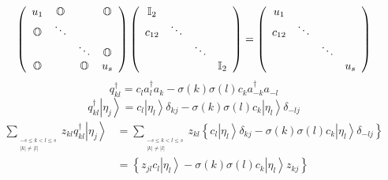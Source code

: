 \documentclass[aps,preprint]{revtex4}%
\begin{document}
\begin{equation}
\left(
\begin{array}
[c]{cccc}%
u_{1} & \mathbb{O} &  & \mathbb{O}\\
\mathbb{O} & \ddots &  & \\
&  & \ddots & \mathbb{O}\\
\mathbb{O} &  & \mathbb{O} & u_{s}%
\end{array}
\right)  \left(
\begin{array}
[c]{cccc}%
\mathbb{I}_{2} &  &  & \\
c_{12} & \ddots &  & \\
&  & \ddots & \\
&  &  & \mathbb{I}_{2}%
\end{array}
\right)  =\left(
\begin{array}
[c]{cccc}%
u_{1} &  &  & \\
c_{12} & \ddots &  & \\
&  & \ddots & \\
&  &  & u_{s}%
\end{array}
\right)
\end{equation}%
\begin{equation}
q_{kl}^{\dagger}=c_{l}a_{l}^{\dagger}a_{k}-\sigma\left(  k\right)
\sigma\left(  l\right)  c_{k}a_{-k}^{\dagger}a_{-l}%
\end{equation}%
\begin{equation}
q_{kl}^{\dagger}\left\vert \eta_{j}\right\rangle =c_{l}\left\vert \eta
_{l}\right\rangle \delta_{kj}-\sigma\left(  k\right)  \sigma\left(  l\right)
c_{k}\left\vert \eta_{l}\right\rangle \delta_{-lj}%
\end{equation}%
\begin{align}
\sum\limits_{_{\substack{-s\leq k<l\leq s\\\left\vert k\right\vert
\neq\left\vert l\right\vert }}}z_{kl}q_{kl}^{\dagger}\left\vert \eta
_{j}\right\rangle  &  =\sum\limits_{_{\substack{-s\leq k<l\leq s\\\left\vert
k\right\vert \neq\left\vert l\right\vert }}}z_{kl}\left\{  c_{l}\left\vert
\eta_{l}\right\rangle \delta_{kj}-\sigma\left(  k\right)  \sigma\left(
l\right)  c_{k}\left\vert \eta_{l}\right\rangle \delta_{-lj}\right\} \\
&  =\left\{  z_{jl}c_{l}\left\vert \eta_{l}\right\rangle -\sigma\left(
k\right)  \sigma\left(  l\right)  c_{k}\left\vert \eta_{l}\right\rangle
z_{kj}\right\}
\end{align}
%
\end{document}
